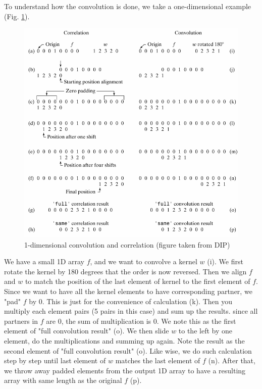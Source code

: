 To understand how the convolution is done, we take a one-dimensional
example (Fig. \ref{fig:img39}).


\begin{figure}[htbp]
\begin{center}
\includegraphics[width=11.718cm]{fig/CMCIBasicCourse201102-img39.png}
\caption{ 1-dimensional convolution and correlation (figure taken from DIP)}
\label{fig:img39}
\end{center}
\end{figure}

We have a small 1D array $f$, and we want to convolve a
kernel $w$ (i). We first rotate the kernel by 180 degrees that
the order is now reversed. Then we align $f$ and $w$ to
match the position of the last element of kernel to the first element
of $f$. Since we want to have all the kernel elements to have
corresponding partner, we "pad" $f$ by 0.
This is just for the convenience of calculation (k). Then you multiply
each element pairs (5 pairs in this case) and sum up the results. since
all partners in $f$ are 0, the sum of multiplication is 0. We note this
as the first element of "full convolution
result" (o). We then slide $w$ to the left by one
element, do the multiplications and summing up again. Note the result
as the second element of "full convolution
result" (o). Like wise, we do such calculation step by
step until last element of $w$ matches the last element of
$f$ (n). After that, we throw away padded elements from the
output 1D array to have a resulting array with same length as the
original $f$ (p). 

